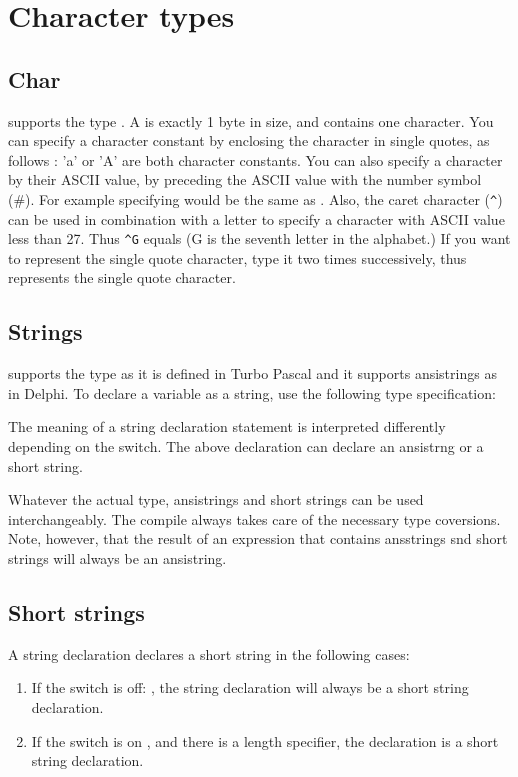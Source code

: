 \documentclass{report}
\begin{document}
\section{Character types}
\subsection{Char}
\fpc supports the type . A  is exactly 1 byte in
size, and contains one character.
You can specify a character constant by enclosing the character in single
quotes, as follows : 'a' or 'A' are both character constants.
You can also specify a character by their ASCII
value, by preceding the ASCII value with the number symbol (\#). For example
specifying  would be the same as .
Also, the caret character (\verb+^+) can be used in combination with a letter to
specify a character with ASCII value less than 27. Thus \verb+^G+ equals
 (G is the seventh letter in the alphabet.)
If you want to represent the single quote character, type it two times
successively, thus  represents the single quote character.

\subsection{Strings}
\fpc supports the  type as it is defined in Turbo Pascal and
it supports ansistrings as in Delphi.
To declare a variable as a string, use the following type specification:


The meaning of a string declaration statement is interpreted differently
depending on the  switch. The above declaration can declare an
ansistrng or a short string.

Whatever the actual type, ansistrings and short strings can be used
interchangeably. The compile always takes care of the necessary type
coversions. Note, however, that the result of an expression that contains
ansstrings snd short strings will always be an ansistring.

\subsection{Short strings}

A string declaration declares a short string in the following cases:

\begin{enumerate}
\item If the switch is off: , the string declaration
will always be a short string declaration.
\item If the switch is on , and there is a length
specifier, the declaration is a short string declaration.
\end{enumerate}
\end{document}
